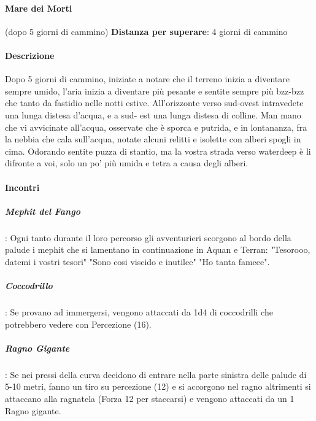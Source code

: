 \documentclass{article}
\begin{document}
                \paragraph{Mare dei Morti} (dopo 5 giorni di cammino) 
\textbf{Distanza per superare}: 4 giorni di cammino

                \paragraph{	Descrizione } Dopo 5 giorni di cammino, iniziate a notare che il terreno inizia a diventare sempre umido, l'aria inizia a diventare più pesante e sentite sempre più bzz-bzz che tanto da fastidio nelle notti estive. All'orizzonte verso sud-ovest intravedete una lunga distesa d'acqua, e a sud- est una lunga distesa di colline. Man mano che vi avvicinate all'acqua, osservate che è sporca e putrida, e in lontananza, fra la nebbia che cala sull'acqua, notate alcuni relitti e isolette con alberi spogli in cima. Odorando  sentite puzza di stantio, ma la vostra strada verso waterdeep è li difronte a voi, solo un po' più umida e tetra a causa degli alberi. 

                \paragraph{Incontri}

                        \subparagraph{Mephit del Fango}: Ogni tanto durante il loro percorso gli avventurieri scorgono al bordo della palude i mephit che si lamentano in continuazione in Aquan e Terran:  "Tesorooo, datemi i vostri tesori" "Sono cosi viscido e inutilee" "Ho tanta fameee".

                        \subparagraph{Coccodrillo}: Se provano ad immergersi, vengono attaccati da 1d4 di coccodrilli che potrebbero vedere con Percezione (16).

                        \subparagraph{Ragno Gigante}: Se nei pressi della curva decidono di entrare nella parte sinistra delle palude di 5-10 metri, fanno un tiro su percezione (12) e si accorgono nel ragno altrimenti si attaccano alla ragnatela (Forza 12 per staccarsi) e vengono attaccati da un 1 Ragno gigante. 
\end{document}
